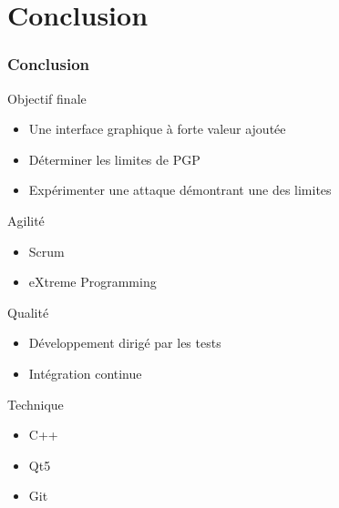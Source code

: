 \section{Conclusion}
\begin{frame}
  \frametitle{\color{white}Conclusion}
  \begin{block}{Objectif finale}
    \begin{itemize}
     \item Une interface graphique à forte valeur ajoutée
     \item Déterminer les limites de PGP
     \item Expérimenter une attaque démontrant une des limites
    \end{itemize}
  \end{block}
  
  \begin{block}{Agilité}
    \begin{itemize}
     \item Scrum
     \item eXtreme Programming
    \end{itemize}
  \end{block}
     
  \begin{block}{Qualité}
    \begin{itemize}
     \item Développement dirigé par les tests
     \item Intégration continue
    \end{itemize}
  \end{block}
  
  \begin{block}{Technique}
    \begin{itemize}
     \item C++
     \item Qt5
     \item Git
    \end{itemize}
  \end{block}
\end{frame}
        
